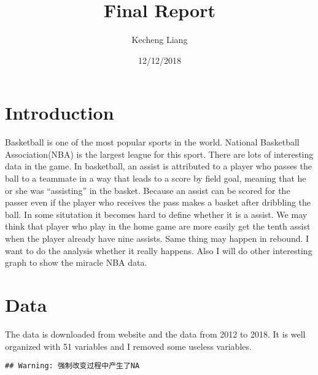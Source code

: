 \documentclass[]{article}
\title{Final Report}
\author{Kecheng Liang}
\date{12/12/2018}
\newenvironment{Shaded}{\begin{snugshade}}{\end{snugshade}}
\newcommand{\KeywordTok}[1]{\textcolor[rgb]{0.13,0.29,0.53}{\textbf{#1}}}
\newcommand{\StringTok}[1]{\textcolor[rgb]{0.31,0.60,0.02}{#1}}
\newcommand{\OperatorTok}[1]{\textcolor[rgb]{0.81,0.36,0.00}{\textbf{#1}}}
\newcommand{\NormalTok}[1]{#1}
\begin{document}
\maketitle

\section{Introduction}\label{introduction}

Basketball is one of the most popular sports in the world. National
Basketball Association(NBA) is the largest league for this sport. There
are lots of interesting data in the game. In basketball, an assist is
attributed to a player who passes the ball to a teammate in a way that
leads to a score by field goal, meaning that he or she was ``assisting''
in the basket. Because an assist can be scored for the passer even if
the player who receives the pass makes a basket after dribbling the
ball. In some situtation it becomes hard to define whether it is a
assist. We may think that player who play in the home game are more
easily get the tenth assist when the player already have nine assists.
Same thing may happen in rebound. I want to do the analysis whether it
really happens. Also I will do other interesting graph to show the
miracle NBA data.

\section{Data}\label{data}

The data is downloaded from website and the data from 2012 to 2018. It
is well organized with 51 variables and I removed some useless
variables.

\begin{Shaded}
\end{Shaded}

\begin{verbatim}
## Warning: 强制改变过程中产生了NA
\end{verbatim}
\end{document}

